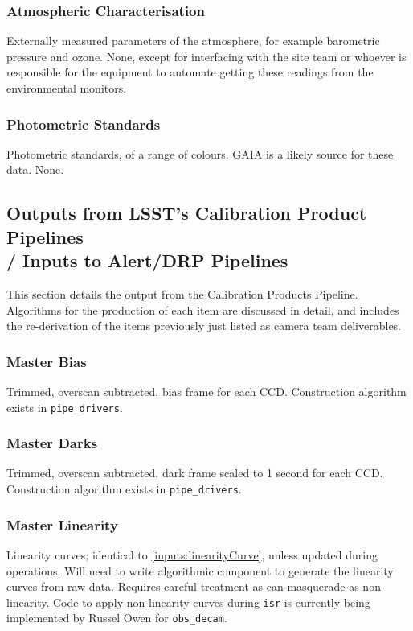 \subsubsection{Atmospheric Characterisation}\label{inputs:atmosphericData}
Externally measured parameters of the atmosphere, for example barometric pressure and ozone.
\alg None, except for interfacing with the site team or whoever is responsible for the equipment to automate getting these readings from the environmental monitors.


\subsubsection{Photometric Standards}\label{inputs:photometricStandards} 
Photometric standards, of a range of colours. GAIA is a likely source for these data.
\alg None.



\subsection{Outputs from LSST's Calibration Product Pipelines \\
	/ Inputs to Alert/DRP Pipelines}
\label{sec:calibrationOutputDatasets}

This section details the output from the Calibration Products Pipeline. Algorithms for the production of each item are discussed in detail, and includes the re-derivation of the items previously just listed as camera team deliverables.

\subsubsection{Master Bias}\label{calibProducts:bias}
Trimmed, overscan subtracted, bias frame for each CCD.
\alg Construction algorithm exists in \texttt{pipe\_drivers}.

\subsubsection{Master Darks}\label{calibProducts:dark}
Trimmed, overscan subtracted, dark frame scaled to 1 second for each CCD.
\alg Construction algorithm exists in \texttt{pipe\_drivers}.


\subsubsection{Master Linearity}\label{calibProducts:linearityCurve}
Linearity curves; identical to \ref{inputs:linearityCurve}, unless updated during operations.
\alg  Will need to write algorithmic component to generate the linearity curves from raw data. Requires careful treatment as \bfeffect can masquerade as non-linearity. Code to apply non-linearity curves during \texttt{isr} is currently being implemented by Russel Owen for \texttt{obs\_decam}.



